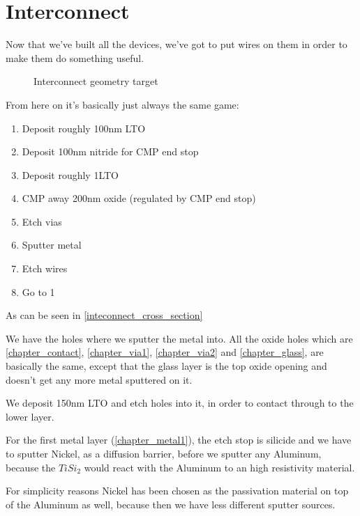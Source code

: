 \section{Interconnect}

Now that we've built all the devices, we've got to put wires on them in order to make them do something useful.

\begin{figure}[H]
	\centering
	\begin{tikzpicture}[node distance = 3cm, auto, thick,scale=\CrossAndTopSectionBig, every node/.style={transform shape}]
		
	\end{tikzpicture}
	\caption{Interconnect geometry target}
	\label{inteconnect_cross_section}
\end{figure}

From here on it's basically just always the same game:
\begin{enumerate}
	\item Deposit roughly 100nm LTO
	\item Deposit 100nm nitride for CMP end stop
	\item Deposit roughly 1\um LTO
	\item CMP away 200nm oxide (regulated by CMP end stop)
	\item Etch vias
	\item Sputter metal
	\item Etch wires
	\item Go to 1
\end{enumerate}

As can be seen in \autoref{inteconnect_cross_section}

We have the holes where we sputter the metal into.
All the oxide holes which are \autoref{chapter_contact}, \autoref{chapter_via1}, \autoref{chapter_via2} and \autoref{chapter_glass}, are basically the same,
except that the glass layer is the top oxide opening and doesn't get any more metal sputtered on it.

We deposit 150nm LTO and etch holes into it, in order to contact through to the lower layer.

For the first metal layer (\autoref{chapter_metal1}), the etch stop is silicide and we have to sputter Nickel, as a diffusion barrier, before we sputter any Aluminum,
because the $Ti Si_2$ would react with the Aluminum to an high resistivity material.

For simplicity reasons Nickel has been chosen as the passivation material on top of the Aluminum as well, because then we have less different sputter sources.

